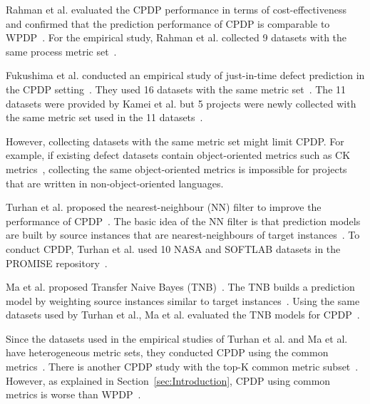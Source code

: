 Rahman et al. evaluated the CPDP performance in terms of
cost-effectiveness and confirmed that the prediction performance of CPDP is
comparable to WPDP~\cite{Rahman12}. For the empirical study, Rahman et al.
collected 9 datasets with the same process metric set~\cite{Rahman12}.

Fukushima et al. conducted an empirical study of just-in-time defect prediction
in the CPDP setting~\cite{Fukushima14}. They used 16
datasets with the same metric set~\cite{Fukushima14}. The 11 datasets were
provided by Kamei et al. but 5 projects were newly collected with the same metric
set used in the 11 datasets~\cite{Fukushima14,Kamei13}.

However, collecting datasets with the
same metric set might limit CPDP. For example, if
existing defect datasets contain object-oriented metrics such as CK
metrics~\cite{Basili96}, collecting the same object-oriented metrics is
impossible for projects that are written in non-object-oriented languages.

Turhan et al. proposed the nearest-neighbour (NN) filter to improve the
performance of CPDP~\cite{Turhan09}. The basic idea of the NN
filter is that prediction models are built by source instances that are
nearest-neighbours of target instances~\cite{Turhan09}. To conduct
CPDP, Turhan et al. used 10 NASA and SOFTLAB datasets in the
PROMISE repository~\cite{promise12,Turhan09}.

Ma et al. proposed Transfer Naive Bayes (TNB)~\cite{Ma12}. The TNB builds a
prediction model by weighting source instances similar to target
instances~\cite{Ma12}. Using the same datasets used by Turhan et al., Ma et al.
evaluated the TNB models for CPDP~\cite{Ma12,Turhan09}.

Since the datasets used in the empirical studies of Turhan et al. and Ma et al.
have heterogeneous metric sets, they conducted CPDP using the common
metrics~\cite{Ma12,Turhan09}. There is another CPDP study with the top-K
common metric subset~\cite{He14subset}. However, as explained in
Section~\ref{sec:Introduction}, CPDP using common metrics is
worse than WPDP~\cite{He14subset,Turhan09}.



